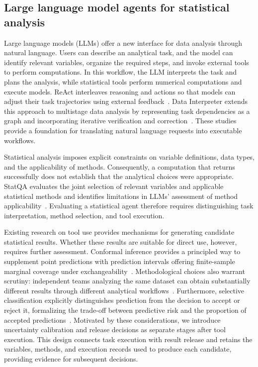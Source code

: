 \documentclass[preprint,12pt,authoryear]{elsarticle}
\begin{document}
\subsection{Large language model agents for statistical analysis}
\label{subsec:statistical_agents}
Large language models (LLMs) offer a new interface for data analysis through natural language. Users can describe an analytical task, and the model can identify relevant variables, organize the required steps, and invoke external tools to perform computations. In this workflow, the LLM interprets the task and plans the analysis, while statistical tools perform numerical computations and execute models. ReAct interleaves reasoning and actions so that models can adjust their task trajectories using external feedback~\citep{yao2023react}. Data Interpreter extends this approach to multistage data analysis by representing task dependencies as a graph and incorporating iterative verification and correction~\citep{hong2025data}. These studies provide a foundation for translating natural language requests into executable workflows.

Statistical analysis imposes explicit constraints on variable definitions, data types, and the applicability of methods. Consequently, a computation that returns successfully does not establish that the analytical choices were appropriate. StatQA evaluates the joint selection of relevant variables and applicable statistical methods and identifies limitations in LLMs' assessment of method applicability~\citep{zhu2024large}. Evaluating a statistical agent therefore requires distinguishing task interpretation, method selection, and tool execution. 

Existing research on tool use provides mechanisms for generating candidate statistical results. Whether these results are suitable for direct use, however, requires further assessment. Conformal inference provides a principled way to supplement point predictions with prediction intervals offering finite-sample marginal coverage under exchangeability~\citep{lei2018distribution}. Methodological choices also warrant scrutiny: independent teams analyzing the same dataset can obtain substantially different results through different analytical workflows~\citep{botvinik2020variability}. Furthermore, selective classification explicitly distinguishes prediction from the decision to accept or reject it, formalizing the trade-off between predictive risk and the proportion of accepted predictions~\citep{elyaniv2010foundations}. Motivated by these considerations, we introduce uncertainty calibration and release decisions as separate stages after tool execution. This design connects task execution with result release and retains the variables, methods, and execution records used to produce each candidate, providing evidence for subsequent decisions.
\end{document}
